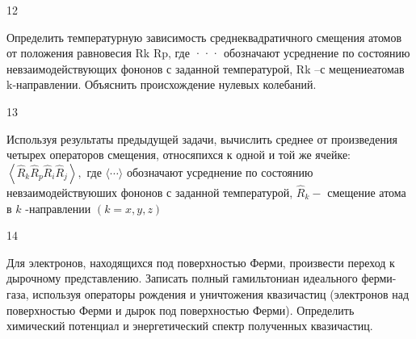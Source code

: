 \documentclass[a4paper,12pt]{article} %
\begin{document}
\begin{task}

12

Определить температурную зависимость среднеквадратичного смещения атомов от положения равновесия Rk Rp, где ··· обозначают усреднение по состоянию невзаимодействующих фононов с заданной температурой,  Rk –с мещениеатомав k-направлении. Объяснить происхождение нулевых колебаний.













\end{task}


\begin{task}

13

Используя результаты предыдущей задачи, вычислить среднее от произведения четырех операторов смещения, относяпихся к одной и той же ячейке: $\left\langle\hat{R}_{k} \hat{R}_{p} \hat{R}_{i} \hat{R}_{j}\right\rangle,$ где $\langle\cdots\rangle$ обозначают усреднение по состоянию невзаимодействуюших фононов с заданной температурой, $\hat{R}_{k}-$ смещение атома в $k$ -направлении $(k=x, y, z)$















\end{task}


\begin{task}

14

Для электронов, находящихся под поверхностью Ферми, произвести переход к дырочному представлению. Записать полный гамильтониан идеального ферми-газа, используя операторы рождения и уничтожения квазичастиц (электронов над поверхностью Ферми и дырок под поверхностью Ферми). Определить химический потенциал и энергетический спектр полученных квазичастиц. 













\end{task}
\end{document}
